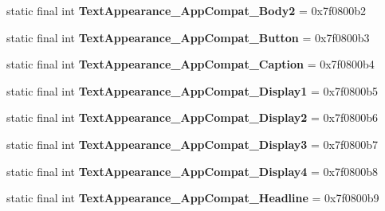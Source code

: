 \begin{DoxyCompactItemize}
\item 
\hypertarget{classandroid_1_1support_1_1design_1_1_r_1_1style_a984f35eb8517130ee3bb9c77f4db3d6b}{}static final int {\bfseries Text\+Appearance\+\_\+\+App\+Compat\+\_\+\+Body2} = 0x7f0800b2\label{classandroid_1_1support_1_1design_1_1_r_1_1style_a984f35eb8517130ee3bb9c77f4db3d6b}

\item 
\hypertarget{classandroid_1_1support_1_1design_1_1_r_1_1style_abb6ae1be3e2e1bd68fd51e2d090dbb82}{}static final int {\bfseries Text\+Appearance\+\_\+\+App\+Compat\+\_\+\+Button} = 0x7f0800b3\label{classandroid_1_1support_1_1design_1_1_r_1_1style_abb6ae1be3e2e1bd68fd51e2d090dbb82}

\item 
\hypertarget{classandroid_1_1support_1_1design_1_1_r_1_1style_a7beee5ea7f39ff6f540899b876335d06}{}static final int {\bfseries Text\+Appearance\+\_\+\+App\+Compat\+\_\+\+Caption} = 0x7f0800b4\label{classandroid_1_1support_1_1design_1_1_r_1_1style_a7beee5ea7f39ff6f540899b876335d06}

\item 
\hypertarget{classandroid_1_1support_1_1design_1_1_r_1_1style_a3d7fcc642e94e5d0da4cc0eb050d4377}{}static final int {\bfseries Text\+Appearance\+\_\+\+App\+Compat\+\_\+\+Display1} = 0x7f0800b5\label{classandroid_1_1support_1_1design_1_1_r_1_1style_a3d7fcc642e94e5d0da4cc0eb050d4377}

\item 
\hypertarget{classandroid_1_1support_1_1design_1_1_r_1_1style_a5119c9d4d6b9119f974c3cc3d3274622}{}static final int {\bfseries Text\+Appearance\+\_\+\+App\+Compat\+\_\+\+Display2} = 0x7f0800b6\label{classandroid_1_1support_1_1design_1_1_r_1_1style_a5119c9d4d6b9119f974c3cc3d3274622}

\item 
\hypertarget{classandroid_1_1support_1_1design_1_1_r_1_1style_afcc42ebd522f07fcc0fd82c0b6c8ec54}{}static final int {\bfseries Text\+Appearance\+\_\+\+App\+Compat\+\_\+\+Display3} = 0x7f0800b7\label{classandroid_1_1support_1_1design_1_1_r_1_1style_afcc42ebd522f07fcc0fd82c0b6c8ec54}

\item 
\hypertarget{classandroid_1_1support_1_1design_1_1_r_1_1style_a9b9f3be8cc0db80bccd10e2d09001c13}{}static final int {\bfseries Text\+Appearance\+\_\+\+App\+Compat\+\_\+\+Display4} = 0x7f0800b8\label{classandroid_1_1support_1_1design_1_1_r_1_1style_a9b9f3be8cc0db80bccd10e2d09001c13}

\item 
\hypertarget{classandroid_1_1support_1_1design_1_1_r_1_1style_a8d4490bb630d7ae6f24ef8a91885d63e}{}static final int {\bfseries Text\+Appearance\+\_\+\+App\+Compat\+\_\+\+Headline} = 0x7f0800b9\label{classandroid_1_1support_1_1design_1_1_r_1_1style_a8d4490bb630d7ae6f24ef8a91885d63e}


\end{DoxyCompactItemize}
